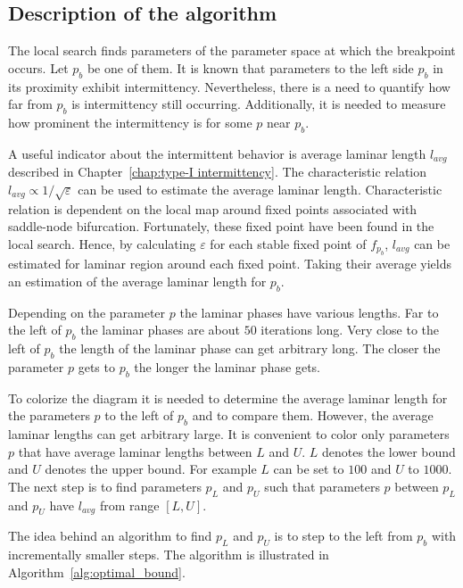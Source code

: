 \subsection{Description of the algorithm}
The local search finds parameters of the parameter space at which the breakpoint occurs.
Let $p_b$ be one of them.
It is known that parameters to the left side $p_b$ in its proximity exhibit intermittency.
Nevertheless, there is a need to quantify how far from $p_b$ is intermittency still occurring.
Additionally, it is needed to measure how prominent the intermittency is for some $p$ near $p_b$.
\par
A useful indicator about the intermittent behavior is average laminar length $l_{avg}$ described in Chapter~\ref{chap:type-I intermittency}.
The characteristic relation $l_{avg} \varpropto 1 / \sqrt{\varepsilon}$ can be used to estimate the average laminar length.
Characteristic relation is dependent on the local map around fixed points associated with saddle-node bifurcation.
Fortunately, these fixed point have been found in the local search.
Hence, by calculating $\varepsilon$ for each stable fixed point of $f_{p_b}$, $l_{avg}$ can be estimated for laminar region around each fixed point.
Taking their average yields an estimation of the average laminar length for $p_b$.
\par
Depending on the parameter $p$ the laminar phases have various lengths.
Far to the left of $p_b$ the laminar phases are about $50$ iterations long.
Very close to the left of $p_b$ the length of the laminar phase can get arbitrary long.
The closer the parameter $p$ gets to $p_b$ the longer the laminar phase gets.
\par
To colorize the diagram it is needed to determine the average laminar length for the parameters $p$ to the left of $p_b$ and to compare them.
However, the average laminar lengths can get arbitrary large.
It is convenient to color only parameters $p$ that have average laminar lengths between $L$ and $U$. 
$L$ denotes the lower bound and $U$ denotes the upper bound.
For example $L$ can be set to $100$ and $U$ to $1000$.
The next step is to find parameters $p_L$ and $p_U$ such that parameters $p$ between $p_L$ and $p_U$ have $l_{avg}$ from range $[ L, U ]$.
\par
The idea behind an algorithm to find $p_L$ and $p_U$ is to step to the left from $p_b$ with incrementally smaller steps.
The algorithm is illustrated in Algorithm~\ref{alg:optimal_bound}.

